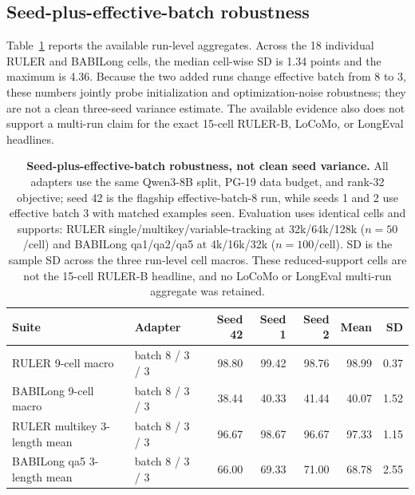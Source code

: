 



\subsection{Seed-plus-effective-batch robustness}

Table~\ref{tab:seed-batch-robustness} reports the available run-level
aggregates. Across the 18 individual RULER and BABILong cells, the median
cell-wise SD is 1.34 points and the maximum is 4.36. Because the two added runs
change effective batch from 8 to 3, these numbers jointly probe initialization
and optimization-noise robustness; they are not a clean three-seed variance
estimate. The available evidence also does not support a multi-run claim for the
exact 15-cell RULER-B, LoCoMo, or LongEval headlines.

\begin{table}[!t]
\centering
\small
\setlength{\tabcolsep}{4pt}
\begin{tabular}{@{}llrrrrr@{}}
\toprule
\textbf{Suite} & \textbf{Adapter} & \textbf{Seed 42} & \textbf{Seed 1} &
\textbf{Seed 2} & \textbf{Mean} & \textbf{SD} \\
\midrule
RULER 9-cell macro & batch 8 / 3 / 3 & 98.80 & 99.42 & 98.76 & 98.99 & 0.37 \\
BABILong 9-cell macro & batch 8 / 3 / 3 & 38.44 & 40.33 & 41.44 & 40.07 & 1.52 \\
\midrule
RULER multikey 3-length mean & batch 8 / 3 / 3 & 96.67 & 98.67 & 96.67 & 97.33 & 1.15 \\
BABILong qa5 3-length mean & batch 8 / 3 / 3 & 66.00 & 69.33 & 71.00 & 68.78 & 2.55 \\
\bottomrule
\end{tabular}
\caption{\textbf{Seed-plus-effective-batch robustness, not clean seed
variance.} All adapters use the same Qwen3-8B split, PG-19 data budget, and
rank-32 objective; seed 42 is the flagship effective-batch-8 run, while seeds
1 and 2 use effective batch 3 with matched examples seen. Evaluation uses
identical cells and supports: RULER single/multikey/variable-tracking at
32k/64k/128k ($n{=}50$/cell) and BABILong qa1/qa2/qa5 at
4k/16k/32k ($n{=}100$/cell). SD is the sample SD across the three run-level
cell macros. These reduced-support cells are not the 15-cell RULER-B headline,
and no LoCoMo or LongEval multi-run aggregate was retained.}
\label{tab:seed-batch-robustness}
\end{table}


